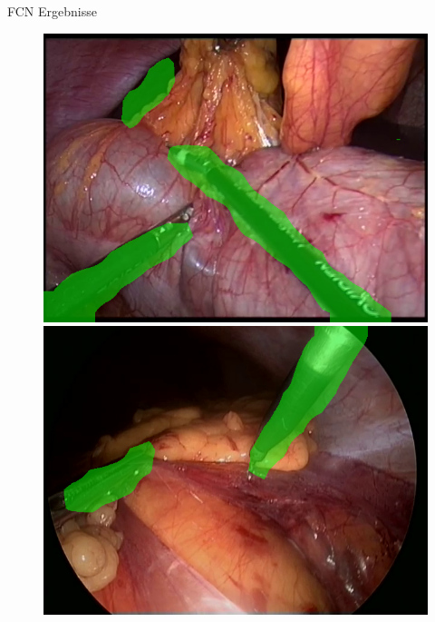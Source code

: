\begin{frame}{FCN Ergebnisse}
    \begin{figure}[ht]
        \begin{minipage}[b]{0.45\linewidth}
            \centering
            \includegraphics*[width=\linewidth, keepaspectratio]{../images/7-img_07.png}
        \end{minipage}
        \hspace{0.5cm}
        \begin{minipage}[b]{0.45\linewidth}
            \centering
            \includegraphics*[width=\linewidth, keepaspectratio]{../images/115-img_25.png}
        \end{minipage}
    \end{figure}


\end{frame}
